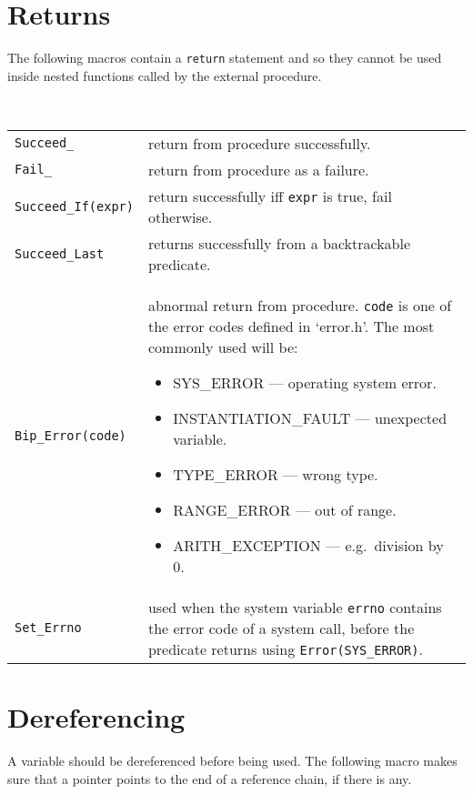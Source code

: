 \newpage
\section{Returns}
The following macros contain a {\tt return} statement and so they
cannot be used inside nested functions called by the external procedure.

\noindent
 \\
\begin{tabular}{|p{5cm}p{10cm}|} 
\hline
{\tt Succeed_} & return from procedure successfully.\\  

{\tt Fail_} & return from procedure as a failure.\\ 

{\tt Succeed_If(expr)} &
return successfully iff {\tt expr} is true, fail otherwise.\\

{\tt Succeed_Last} &
returns successfully from a backtrackable predicate.\\

{\tt Bip_Error(code)} &
abnormal return from procedure. {\tt code} is one of the
error codes defined in `error.h'. The most commonly used will be:
\begin{itemize}
\item SYS_ERROR --- operating system error.
\item INSTANTIATION_FAULT --- unexpected variable.
\item TYPE_ERROR --- wrong type.
\item RANGE_ERROR --- out of range.
\item ARITH_EXCEPTION --- e.g.\ division by 0.
\end{itemize}
\\

{\tt Set_Errno} &
used when the system variable {\tt errno} contains the error code
of a system call, before the predicate returns using
{\tt Error(SYS_ERROR)}.\\
\hline
\end{tabular}


\section{Dereferencing}
A variable should be dereferenced before being used. The following
macro makes sure that a pointer points to the end of a reference
chain, if there is any.


